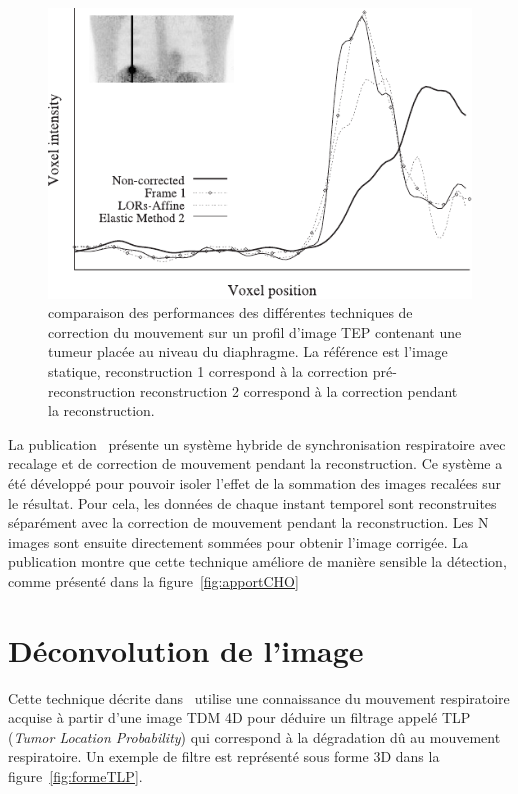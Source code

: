 \begin{figure}[h!]
	\begin{center}
		\includegraphics[width=12cm]{images/lamare2007list.pdf}
	\end{center}
	\caption[comparaison des performances des différentes techniques de correction du mouvement sur un profil d'image TEP]{comparaison des performances des différentes techniques de correction du mouvement sur un profil d'image TEP contenant une tumeur placée au niveau du diaphragme. La référence est l'image statique, reconstruction 1 correspond à la correction pré-reconstruction reconstruction 2 correspond à la correction pendant la reconstruction.} 
	\label{fig:lamare2007}
\end{figure}

La publication~\cite{Thielemans2006Lesion} présente un système hybride de synchronisation respiratoire avec recalage et de correction de mouvement pendant la reconstruction. Ce système a été développé pour pouvoir isoler l'effet de la sommation des images recalées sur le résultat. Pour cela, les données de chaque instant temporel sont reconstruites séparément avec la correction de mouvement pendant la reconstruction. Les N images sont ensuite directement sommées pour obtenir l'image corrigée. La publication montre que cette technique améliore de manière sensible la détection, comme présenté dans la figure~\ref{fig:apportCHO}
\label{lab:evolGating}

\section{Déconvolution de l'image}

Cette technique décrite dans~\cite{naqa2006deblurring} utilise une connaissance du mouvement respiratoire acquise à partir d'une image TDM 4D pour déduire un filtrage appelé TLP (\textit{Tumor Location Probability}) qui correspond à la dégradation dû au mouvement respiratoire. Un exemple de filtre est représenté sous forme 3D dans la figure~\ref{fig:formeTLP}.

